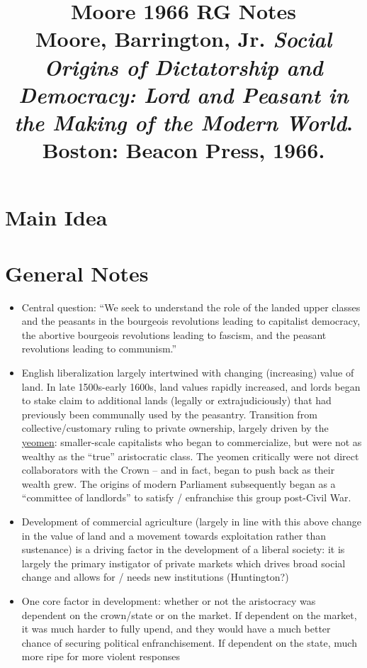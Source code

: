 \documentclass[12pt]{article}
\title{\textbf{Moore 1966 RG Notes}\\
\large Moore, Barrington, Jr. \textit{Social Origins of Dictatorship and Democracy: Lord and Peasant in the Making of the Modern World}.\\
Boston: Beacon Press, 1966.}
\author{}
\date{}
\begin{document}
\maketitle

\section{Main Idea}



\section{General Notes}

\begin{itemize}[leftmargin=*, itemsep=4pt]
    \item Central question: ``We seek to understand the role of the landed upper classes and the peasants in the bourgeois revolutions leading to capitalist democracy, the abortive bourgeois revolutions leading to fascism, and the peasant revolutions leading to communism.''
    \item English liberalization largely intertwined with changing (increasing) value of land. In late 1500s-early 1600s, land values rapidly increased, and lords began to stake claim to additional lands (legally or extrajudiciously) that had previously been communally used by the peasantry. Transition from collective/customary ruling to private ownership, largely driven by the \underline{yeomen}: smaller-scale capitalists who began to commercialize, but were not as wealthy as the ``true'' aristocratic class. The yeomen critically were not direct collaborators with the Crown -- and in fact, began to push back as their wealth grew. The origins of modern Parliament subsequently began as a ``committee of landlords'' to satisfy / enfranchise this group post-Civil War.
    \item Development of commercial agriculture (largely in line with this above change in the value of land and a movement towards exploitation rather than sustenance) is a driving factor in the development of a liberal society: it is largely the primary instigator of private markets which drives broad social change and allows for / needs new institutions (Huntington?)
    \item One core factor in development: whether or not the aristocracy was dependent on the crown/state or on the market. If dependent on the market, it was much harder to fully upend, and they would have a much better chance of securing political enfranchisement. If dependent on the state, much more ripe for more violent responses

\end{itemize}
\end{document}
